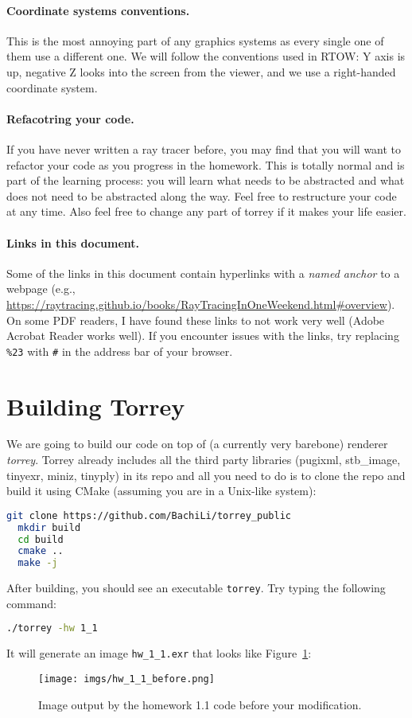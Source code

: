 \paragraph{Coordinate systems conventions.} This is the most annoying part of any graphics systems as every single one of them use a different one. We will follow the conventions used in RTOW: Y axis is up, negative Z looks into the screen from the viewer, and we use a right-handed coordinate system.

\paragraph{Refacotring your code.} If you have never written a ray tracer before, you may find that you will want to refactor your code as you progress in the homework. This is totally normal and is part of the learning process: you will learn what needs to be abstracted and what does not need to be abstracted along the way. Feel free to restructure your code at any time. Also feel free to change any part of torrey if it makes your life easier.

\paragraph{Links in this document.} Some of the links in this document contain hyperlinks with a \emph{named anchor} to a webpage (e.g., \url{https://raytracing.github.io/books/RayTracingInOneWeekend.html\#overview}). On some PDF readers, I have found these links to not work very well (Adobe Acrobat Reader works well). If you encounter issues with the links, try replacing \lstinline{%23} with \lstinline{#} in the address bar of your browser.

\section{Building Torrey}
We are going to build our code on top of (a currently very barebone) renderer \emph{torrey}. Torrey already includes all the third party libraries (pugixml, stb\_image, tinyexr, miniz, tinyply) in its repo and all you need to do is to clone the repo and build it using CMake (assuming you are in a Unix-like system):
\begin{lstlisting}[language=bash]
  git clone https://github.com/BachiLi/torrey_public
  mkdir build
  cd build
  cmake ..
  make -j
\end{lstlisting}

After building, you should see an executable \lstinline{torrey}. Try typing the following command:
\begin{lstlisting}[language=bash]
  ./torrey -hw 1_1
\end{lstlisting}
It will generate an image \lstinline{hw_1_1.exr} that looks like Figure~\ref{fig:hw_1_1_before}:
\begin{figure}[ht]
    \centering
    \texttt{[image: imgs/hw\_1\_1\_before.png]}
    \caption{Image output by the homework 1.1 code before your modification.}
    \label{fig:hw_1_1_before}
\end{figure}

